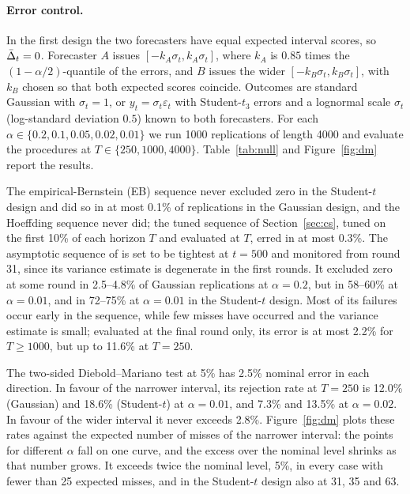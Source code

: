 \paragraph{Error control.}
In the first design the two forecasters have equal expected interval
scores, so $\bar\Delta_t=0$. Forecaster $A$ issues $[-k_A\sigma_t,k_A\sigma_t]$, where $k_A$ is
$0.85$ times the $(1-\alpha/2)$-quantile of the errors, and $B$ issues the
wider $[-k_B\sigma_t,k_B\sigma_t]$, with $k_B$ chosen so that both expected
scores coincide. Outcomes are standard Gaussian with $\sigma_t=1$, or
$y_t=\sigma_t\varepsilon_t$ with Student-$t_3$ errors and a lognormal scale
$\sigma_t$
(log-standard deviation $0.5$) known to both forecasters. For each
$\alpha\in\{0.2,0.1,0.05,0.02,0.01\}$ we run 1000 replications of length
4000 and evaluate the procedures at $T\in\{250,1000,4000\}$.
Table~\ref{tab:null} and Figure~\ref{fig:dm} report the results.

The empirical-Bernstein (EB) sequence never excluded zero in the
Student-$t$ design and did so in at most 0.1\% of replications in the
Gaussian design, and the Hoeffding sequence never did; the tuned
sequence of Section~\ref{sec:cs}, tuned on the first 10\% of each horizon
$T$ and evaluated at $T$, erred in at most 0.3\%. The asymptotic sequence of
\citet{waudbysmith2024time} is set to be tightest at $t=500$ and
monitored from round 31, since its variance estimate is degenerate in the
first rounds. It excluded zero at some round
in 2.5--4.8\% of Gaussian replications at $\alpha=0.2$, but in 58--60\% at
$\alpha=0.01$, and in 72--75\% at $\alpha=0.01$ in the Student-$t$
design. Most of its failures occur early in the sequence, while few
misses have occurred and the variance estimate is small; evaluated at the
final round only, its error is at most 2.2\% for $T\ge1000$, but up to
11.6\% at $T=250$.

The two-sided Diebold--Mariano test at 5\% has 2.5\% nominal error in each
direction. In favour of the narrower interval, its rejection rate at
$T=250$ is 12.0\% (Gaussian) and 18.6\% (Student-$t$) at $\alpha=0.01$,
and 7.3\% and 13.5\% at $\alpha=0.02$. In favour of the wider interval it
never exceeds 2.8\%. Figure~\ref{fig:dm} plots these rates against the
expected number of misses of the narrower interval: the points for
different $\alpha$ fall on one curve, and the excess over the nominal level
shrinks as that number grows. It exceeds twice the nominal level, 5\%,
in every case with fewer than 25 expected misses, and in the Student-$t$
design also at 31, 35 and 63.

